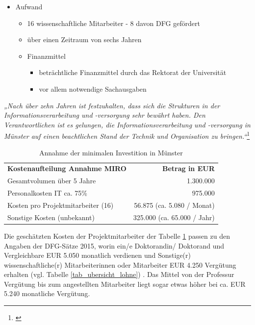 \newpage
		
\begin{itemize}	
	\item Aufwand
	\begin{itemize}
		\item 16 wissenschaftliche Mitarbeiter - 8 davon DFG gefördert
		\item über einen Zeitraum von sechs Jahren
		\item Finanzmittel
		\begin{itemize}
			\item beträchtliche Finanzmittel durch das Rektorat der Universität
			\item vor allem notwendige Sachausgaben
		\end{itemize}
	\end{itemize}
\end{itemize}

\textit{„Nach über zehn Jahren ist festzuhalten, dass sich die Strukturen in der Informationsverarbeitung und -versorgung sehr bewährt haben. Den Verantwortlichen ist es gelungen, die Informationsverarbeitung und -versorgung in Münster auf einen beachtlichen Stand der Technik und Organisation zu bringen.“}\footnote{\cite{bode_informationsmanagement_2010}}

\begin{table}[h!]
	\begin{tabularx}{\textwidth}{l|r}
		\hline
		\textbf{Kostenaufteilung Annahme MIRO} & \textbf{Betrag in EUR}\\
		Gesamtvolumen über 5 Jahre & 1.300.000\\
		Personalkosten IT ca. 75\% & 975.000\\
		Kosten pro Projektmitarbeiter (16) & 56.875 (ca. 5.080 / Monat)\\ 
		Sonstige Kosten (unbekannt) & 325.000 (ca. 65.000 / Jahr)\\
		\hline
    \end{tabularx}
    \caption{Annahme der minimalen Investition in Münster}
    \label{tab_minimale_investition_munster}
\end{table}

Die geschätzten Kosten der Projektmitarbeiter der Tabelle \ref{tab_minimale_investition_munster} passen zu den Angaben der DFG-Sätze 2015, worin ein/e Doktorandin/ Doktorand und Vergleichbare EUR 5.050 monatlich verdienen und Sonstige(r) wissenschaftliche(r) Mitarbeiterinnen oder Mitarbeiter EUR 4.250 Vergütung erhalten (vgl. Tabelle \ref{tab_ubersicht_lohne}) . Das Mittel von der Professur Vergütung bis zum angestellten Mitarbeiter liegt sogar etwas höher bei ca. EUR 5.240 monatliche Vergütung.


